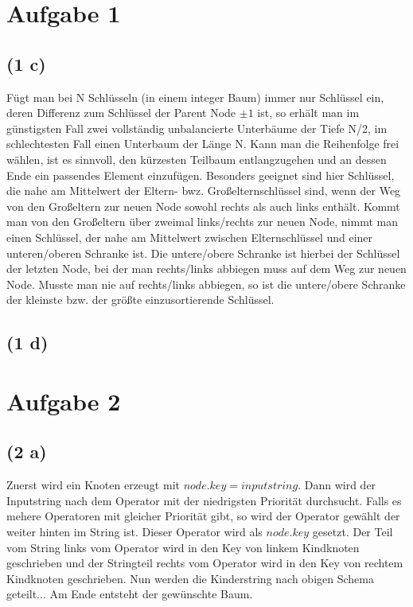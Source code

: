 \documentclass[a4paper]{article}
\begin{document}
\section*{Aufgabe 1}

\subsection*{(1 c)}
Fügt man bei N Schlüsseln (in einem integer Baum) immer nur Schlüssel ein, deren Differenz zum Schlüssel der Parent Node $\pm 1$ ist, so erhält man im günstigsten Fall zwei vollständig unbalancierte Unterbäume der Tiefe N/2, im schlechtesten Fall einen Unterbaum der Länge N. Kann man die Reihenfolge frei wählen, ist es sinnvoll, den kürzesten Teilbaum entlangzugehen und an dessen Ende ein passendes Element einzufügen. Besonders geeignet sind hier Schlüssel, die nahe am Mittelwert der Eltern- bwz. Großelternschlüssel sind, wenn der Weg von den Großeltern zur neuen Node sowohl rechts als auch links enthält. Kommt man von den Großeltern über zweimal links/rechts zur neuen Node, nimmt man einen Schlüssel, der nahe am Mittelwert zwischen Elternschlüssel und einer unteren/oberen Schranke ist. Die untere/obere Schranke ist hierbei der Schlüssel der letzten Node, bei der man rechts/links abbiegen muss auf dem Weg zur neuen Node. Musste man nie auf rechts/links abbiegen, so ist die untere/obere Schranke der kleinste bzw. der größte einzusortierende Schlüssel. 

\subsection*{(1 d)}



\section*{Aufgabe 2}
\subsection*{(2 a)}
Zuerst wird ein Knoten erzeugt mit $node.key = inputstring$. Dann wird der Inputstring nach dem Operator mit der niedrigsten Priorität durchsucht. Falls es mehere Operatoren mit gleicher Priorität gibt, so wird der Operator gewählt der weiter hinten im String ist. Dieser Operator wird als $node.key$ gesetzt. Der Teil vom String links vom Operator wird in den Key von linkem Kindknoten geschrieben und der Stringteil rechts vom Operator wird in den Key von rechtem Kindknoten geschrieben. Nun werden die Kinderstring nach obigen Schema geteilt... Am Ende entsteht der gewünschte Baum.
\end{document}
